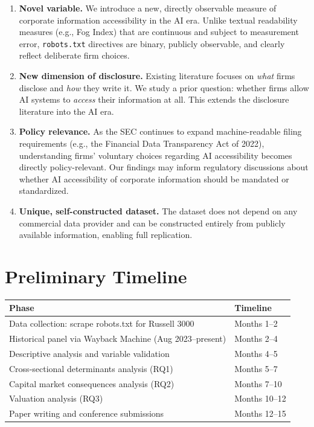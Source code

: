 \documentclass[12pt,a4paper]{article}
\begin{document}
\begin{enumerate}
    \item \textbf{Novel variable.} We introduce a new, directly observable measure of corporate information accessibility in the AI era. Unlike textual readability measures (e.g., Fog Index) that are continuous and subject to measurement error, \texttt{robots.txt} directives are binary, publicly observable, and clearly reflect deliberate firm choices.

    \item \textbf{New dimension of disclosure.} Existing literature focuses on \emph{what} firms disclose and \emph{how} they write it. We study a prior question: whether firms allow AI systems to \emph{access} their information at all. This extends the disclosure literature into the AI era.

    \item \textbf{Policy relevance.} As the SEC continues to expand machine-readable filing requirements (e.g., the Financial Data Transparency Act of 2022), understanding firms' voluntary choices regarding AI accessibility becomes directly policy-relevant. Our findings may inform regulatory discussions about whether AI accessibility of corporate information should be mandated or standardized.

    \item \textbf{Unique, self-constructed dataset.} The dataset does not depend on any commercial data provider and can be constructed entirely from publicly available information, enabling full replication.
\end{enumerate}

\section{Preliminary Timeline}

\begin{table}[htbp]
\centering
\begin{tabular}{ll}
\toprule
\textbf{Phase} & \textbf{Timeline} \\
\midrule
Data collection: scrape robots.txt for Russell 3000 & Months 1--2 \\
Historical panel via Wayback Machine (Aug 2023--present) & Months 2--4 \\
Descriptive analysis and variable validation & Months 4--5 \\
Cross-sectional determinants analysis (RQ1) & Months 5--7 \\
Capital market consequences analysis (RQ2) & Months 7--10 \\
Valuation analysis (RQ3) & Months 10--12 \\
Paper writing and conference submissions & Months 12--15 \\
\bottomrule
\end{tabular}
\end{table}
\end{document}

